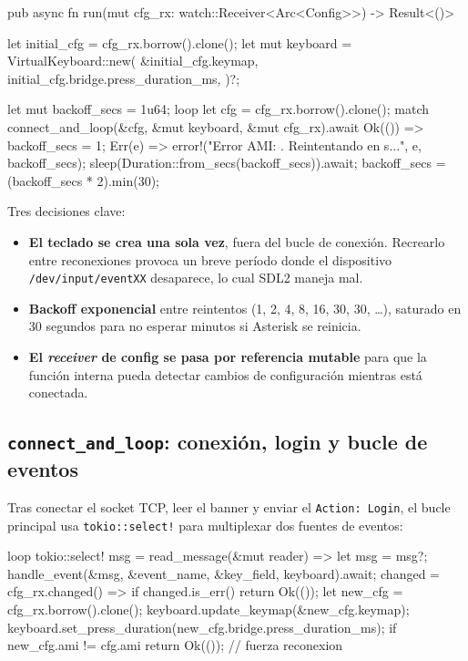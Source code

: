 \begin{rustcode}
pub async fn run(mut cfg_rx: watch::Receiver<Arc<Config>>) -> Result<()> {
    let initial_cfg = cfg_rx.borrow().clone();
    let mut keyboard = VirtualKeyboard::new(
        &initial_cfg.keymap,
        initial_cfg.bridge.press_duration_ms,
    )?;

    let mut backoff_secs = 1u64;
    loop {
        let cfg = cfg_rx.borrow().clone();
        match connect_and_loop(&cfg, &mut keyboard, &mut cfg_rx).await {
            Ok(()) => {
                backoff_secs = 1;
            }
            Err(e) => {
                error!("Error AMI: {}. Reintentando en {}s...", e, backoff_secs);
                sleep(Duration::from_secs(backoff_secs)).await;
                backoff_secs = (backoff_secs * 2).min(30);
            }
        }
    }
}
\end{rustcode}

Tres decisiones clave:

\begin{itemize}
  \item \textbf{El teclado se crea una sola vez}, fuera del bucle de conexión. Recrearlo entre reconexiones provoca un breve período donde el dispositivo \texttt{/dev/input/eventXX} desaparece, lo cual SDL2 maneja mal.
  \item \textbf{Backoff exponencial} entre reintentos (1, 2, 4, 8, 16, 30, 30, \ldots), saturado en 30 segundos para no esperar minutos si Asterisk se reinicia.
  \item \textbf{El \emph{receiver} de config se pasa por referencia mutable} para que la función interna pueda detectar cambios de configuración mientras está conectada.
\end{itemize}

\subsection{\texttt{connect\_and\_loop}: conexión, login y bucle de eventos}

Tras conectar el socket TCP, leer el banner y enviar el \texttt{Action: Login}, el bucle principal usa \texttt{tokio::select!} para multiplexar dos fuentes de eventos:

\begin{rustcode}
loop {
    tokio::select! {
        msg = read_message(&mut reader) => {
            let msg = msg?;
            handle_event(&msg, &event_name, &key_field, keyboard).await;
        }
        changed = cfg_rx.changed() => {
            if changed.is_err() { return Ok(()); }
            let new_cfg = cfg_rx.borrow().clone();
            keyboard.update_keymap(&new_cfg.keymap);
            keyboard.set_press_duration(new_cfg.bridge.press_duration_ms);
            if new_cfg.ami != cfg.ami {
                return Ok(()); // fuerza reconexion
            }
        }
    }
}
\end{rustcode}

